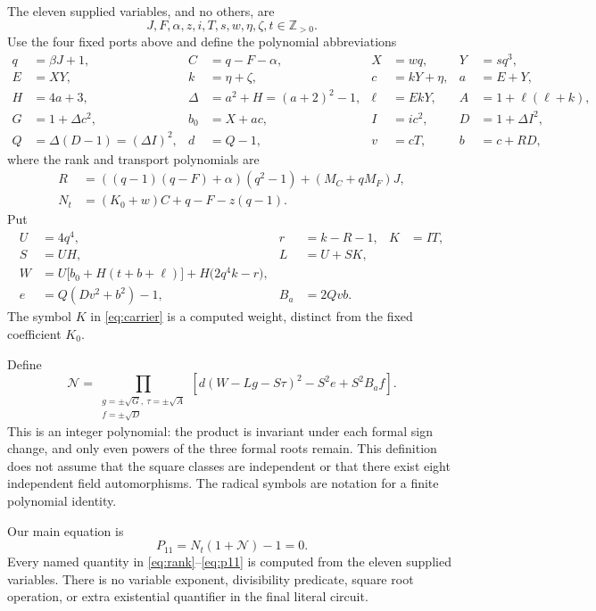 \documentclass[11pt,a4paper]{article}
\newcommand{\Zpos}{\mathbb Z_{>0}}
\theoremstyle{definition}
\theoremstyle{remark}
\numberwithin{equation}{section}
\begin{document}
The eleven supplied variables, and no others, are
\[
 J,F,\alpha,z,i,T,s,w,\eta,\zeta,t\in\Zpos.
\]
Use the four fixed ports above and define the polynomial abbreviations
\begin{align*}
 q&=\beta J+1,& C&=q-F-\alpha,& X&=wq,& Y&=sq^3,\\
 E&=XY,& k&=\eta+\zeta,& c&=kY+\eta,& a&=E+Y,\\
 H&=4a+3,&\Delta&=a^2+H=(a+2)^2-1,
 &\ell&=EkY,& A&=1+\ell(\ell+k),\\
 G&=1+\Delta c^2,& b_0&=X+ac,& I&=ic^2,&D&=1+\Delta I^2,\\
 Q&=\Delta(D-1)=(\Delta I)^2,&d&=Q-1,&v&=cT,&b&=c+RD,
\end{align*}
where the rank and transport polynomials are
\begin{align}
 R&=((q-1)(q-F)+\alpha)(q^2-1)+(M_C+qM_F)J,\label{eq:rank}\\
 N_t&=(K_0+w)C+q-F-z(q-1).\label{eq:transport}
\end{align}
Put
\begin{align}
 U&=4q^4,&r&=k-R-1,& K&=IT,\nonumber\\
 S&=UH,& L&=U+SK,\nonumber\\
 W&=U\bigl[b_0+H(t+b+\ell)\bigr]+H\bigl(2q^4k-r\bigr),\label{eq:carrier}\\
 e&=Q(Dv^2+b^2)-1,&B_{\!a}&=2Qvb.\nonumber
\end{align}
The symbol $K$ in \eqref{eq:carrier} is a computed weight, distinct
from the fixed coefficient $K_0$.

Define
\begin{equation}
 \mathcal N=
 \prod_{\substack{g=\pm\sqrt G,\ \tau=\pm\sqrt A\\ f=\pm\sqrt D}}
 \left[d(W-Lg-S\tau)^2-S^2e+S^2B_{\!a}f\right].
 \label{eq:formalnorm}
\end{equation}
This is an integer polynomial: the product is invariant under each
formal sign change, and only even powers of the three formal roots
remain. This definition does not assume that the square classes are
independent or that there exist eight independent field automorphisms.
The radical symbols are notation for a finite polynomial identity.

Our main equation is
\begin{equation}
 \boxed{\quad P_{11}=N_t(1+\mathcal N)-1=0.\quad}
 \label{eq:p11}
\end{equation}
Every named quantity in \eqref{eq:rank}--\eqref{eq:p11} is computed
from the eleven supplied variables. There is no variable exponent,
divisibility predicate, square root operation, or extra existential
quantifier in the final literal circuit.
\end{document}
